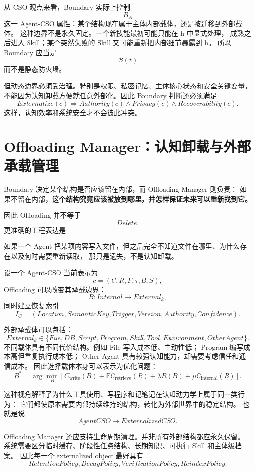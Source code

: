 从 CSO 观点来看，Boundary 实际上控制
\[
B_A
\]
这一 Agent-CSO 属性：某个结构现在属于主体内部载体，还是被迁移到外部载体。
这种边界不是永久固定。一个新技能最初可能只能在 h 中显式处理，
成熟之后进入 Skill；某个突然失败的 Skill 又可能重新把内部细节暴露到 h。
所以 Boundary 应当是
\[
\mathcal B(t)
\]
而不是静态防火墙。

但动态边界必须受治理。特别是权限、私密记忆、主体核心状态和安全关键变量，
不能因为认知卸载方便就任意外部化。因此 Boundary 判断还必须满足
\[
Externalize(c)
\Rightarrow
Authority(c)\land Privacy(c)\land Recoverability(c).
\]
这样，认知效率和系统安全才不会彼此冲突。


\section{Offloading Manager：认知卸载与外部承载管理}

Boundary 决定某个结构是否应该留在内部，而 Offloading Manager 则负责：
如果不留在内部，\textbf{这个结构究竟应该被放到哪里，并怎样保证未来可以重新找到它。}

因此 Offloading 并不等于
\[
Delete.
\]
更准确的工程表达是
\begin{statementbox}
\centering
{}
\end{statementbox}
如果一个 Agent 把某项内容写入文件，但之后完全不知道文件在哪里、为什么存在以及何时需要重新读取，
那只是遗失，不是认知卸载。

设一个 Agent-CSO 当前表示为
\[
c=
(C,R,F,\tau,B,S),
\]
Offloading 可以改变其承载边界：
\[
B:
Internal
\rightarrow
External_k,
\]
同时建立恢复索引
\[
I_C
=
(Location,
SemanticKey,
Trigger,
Version,
Authority,
Confidence).
\]

外部承载体可以包括：
\[
External_k\in
\{
File,
DB,
Script,
Program,
Skill,
Tool,
Environment,
OtherAgent
\}.
\]
不同载体具有不同代价结构。例如 File 写入成本低、主动性低；
Program 编写成本高但重复执行成本低；
Other Agent 具有较强认知能力，却需要考虑信任和通信成本。
因此选择载体本身可以表示为优化问题：
\[
B^\ast
=
\arg\min_B
\left[
C_{\mathrm{write}}(B)
+
\mathbb E C_{\mathrm{retrieve}}(B)
+
\lambda R(B)
+
\mu C_{\mathrm{internal}}(B)
\right].
\]

这种视角解释了为什么工具使用、写程序和记笔记在认知动力学上属于同一类行为：
它们都使原本需要内部持续维持的结构，转化为外部世界中的稳定结构。
也就是说：
\[
AgentCSO
\rightarrow
ExternalizedCSO.
\]

Offloading Manager 还应支持生命周期清理。并非所有外部结构都应永久保留。
系统需要区分临时缓存、阶段性任务结构、长期知识、可执行 Skill 和主体级档案。
因此每一个 externalized object 最好具有
\[
RetentionPolicy,
DecayPolicy,
VerificationPolicy,
ReindexPolicy.
\]

